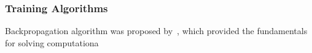 \subsubsection{Training Algorithms}
Backpropagation algorithm was proposed by~\citet{werbos1975beyond}, which provided the fundamentals for solving  computationa
